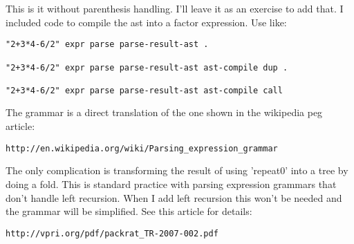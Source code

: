 This is it without parenthesis handling. I'll leave it as an exercise
to add that. I included code to compile the ast into a factor
expression. Use like:

\begin{verbatim}
"2+3*4-6/2" expr parse parse-result-ast .

"2+3*4-6/2" expr parse parse-result-ast ast-compile dup .

"2+3*4-6/2" expr parse parse-result-ast ast-compile call
\end{verbatim}

The grammar is a direct translation of the one shown in the wikipedia
peg article:

\begin{verbatim}
http://en.wikipedia.org/wiki/Parsing_expression_grammar
\end{verbatim}

The only complication is transforming the result of using 'repeat0'
into a tree by doing a fold. This is standard practice with parsing
expression grammars that don't handle left recursion. When I add left
recursion this won't be needed and the grammar will be simplified.
See this article for details:

\begin{verbatim}
http://vpri.org/pdf/packrat_TR-2007-002.pdf
\end{verbatim}

